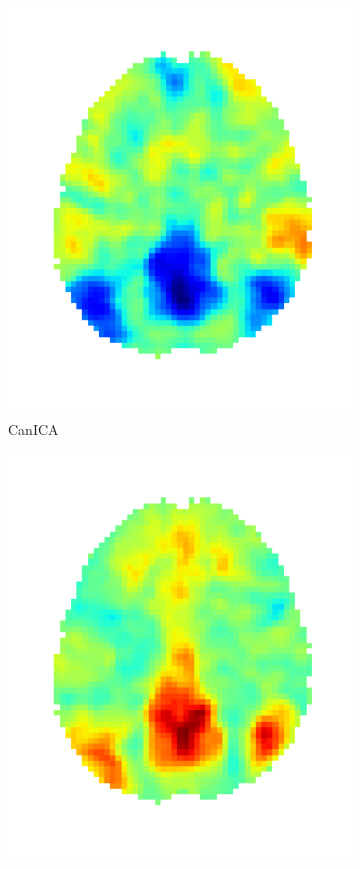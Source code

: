 \documentclass{article} %
\begin{document}
\begin{figure}
\begin{preview}
\begin{subfigure}[b]{.3\linewidth}
        \includegraphics[width=\linewidth]{canica}%
	\vspace*{-1.8em}
        \caption*{\sffamily CanICA}
      \end{subfigure}
      \begin{subfigure}[b]{.3\linewidth}
        \includegraphics[width=\linewidth]{melodic}%

\end{subfigure}
\end{preview}
\end{figure}
\end{document}
